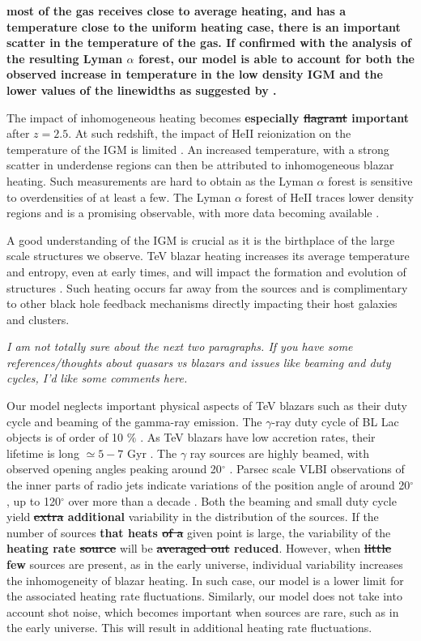 \documentclass[twocolumns]{emulateapj}
\newcommand\ALc[1]{{\color{red} \bf #1}} %
\newcommand\Pc[1]{{\color{cyan} \bf #1}} %
\begin{document}
\ALc{
most of the gas receives close to average heating, and has a temperature close to the uniform heating case, there is an important scatter in the temperature of the gas. If confirmed with the analysis of the resulting Lyman $\alpha$ forest, our model is able to account for both the observed increase in temperature in the low density IGM \citep{2014MNRAS.441.1916B,2009MNRAS.399L..39V} and the lower values  of the linewidths \Pc{ as suggested by \citet{2012ApJ...757L..30R}}.

The impact of inhomogeneous heating becomes \Pc{especially \sout{flagrant} important} after $z=2.5$. At such redshift, the impact of HeII reionization  on the temperature of the IGM is  limited \citep{2013MNRAS.435.3169C}. An increased temperature, with a strong scatter in underdense regions can then be attributed to inhomogeneous blazar heating. Such measurements are hard to obtain as the Lyman $\alpha$ forest is sensitive to overdensities of at least a few.  The Lyman $\alpha$ forest of HeII traces lower density regions and is a promising observable, with more data becoming available \citep{2014arXiv1405.7405W}.

A good understanding of the IGM is crucial as it is the birthplace of the large scale structures we observe. TeV blazar heating increases its average temperature and entropy, even at early times, and will impact the formation and evolution of  structures \citep{2012ApJ...752...24P}. Such heating occurs far away from the sources and  is complimentary to other black hole feedback mechanisms directly impacting their host galaxies and clusters.

\textit{ I am not totally sure about the next two paragraphs. If you have some references/thoughts about quasars vs blazars and issues like beaming and duty cycles, I'd like some comments here.}

Our model neglects important physical aspects of TeV blazars such as their duty cycle and  beaming of the gamma-ray emission. The  $\gamma$-ray duty cycle of BL Lac objects is of order of 10 $\%$ \citep{1996ApJ...464..600S}.  As TeV blazars have low accretion rates, their lifetime is long $\simeq 5-7$ Gyr \citep{2002ApJ...571..226C}.  The $\gamma$ ray sources are highly beamed, with observed opening angles peaking around 20$^{\circ}$ \citep{2009A&A...507L..33P}.  Parsec scale VLBI observations of the inner parts of radio jets indicate variations of the position angle of around 20$^{\circ}$, up to 120$^{\circ}$ over more than a decade \citep{2013AJ....146..120L}.   Both the beaming and small duty cycle yield \Pc{\sout{extra} additional} variability in the distribution of the sources.   If the number  of sources \Pc{that heats \sout{of a}} given point is large, the variability of the \Pc{heating rate \sout{source}} will be \Pc{\sout{averaged out} reduced}. However, when \Pc{\sout{little} few} sources are present, as in the early universe, individual variability increases the inhomogeneity of blazar heating. In such case, our model is a lower limit for the associated heating rate fluctuations. Similarly, our model does not take into account shot noise, which becomes important when sources are rare, such as in the early universe. This will result in additional heating rate fluctuations.

}
\end{document}
